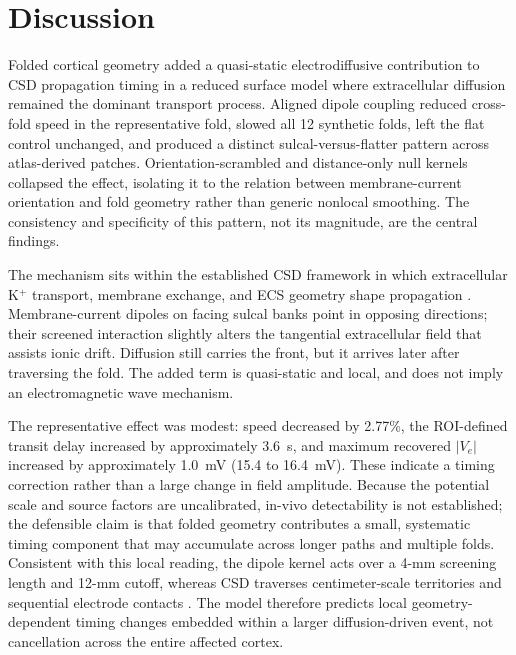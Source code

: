 \documentclass[12pt]{article}
\begin{document}
\section{Discussion}

Folded cortical geometry added a quasi-static electrodiffusive contribution to CSD propagation timing in a reduced surface model where extracellular diffusion remained the dominant transport process. Aligned dipole coupling reduced cross-fold speed in the representative fold, slowed all 12 synthetic folds, left the flat control unchanged, and produced a distinct sulcal-versus-flatter pattern across atlas-derived patches. Orientation-scrambled and distance-only null kernels collapsed the effect, isolating it to the relation between membrane-current orientation and fold geometry rather than generic nonlocal smoothing. The consistency and specificity of this pattern, not its magnitude, are the central findings.

The mechanism sits within the established CSD framework in which extracellular K$^+$ transport, membrane exchange, and ECS geometry shape propagation \citep{Tuckwell1978,Wei2014,Zandt2015,Kelley2022,Saetra2024,Sykova2008,Tonnesen2022}. Membrane-current dipoles on facing sulcal banks point in opposing directions; their screened interaction slightly alters the tangential extracellular field that assists ionic drift. Diffusion still carries the front, but it arrives later after traversing the fold. The added term is quasi-static and local, and does not imply an electromagnetic wave mechanism.

The representative effect was modest: speed decreased by 2.77\%, the ROI-defined transit delay increased by approximately 3.6~s, and maximum recovered $|V_e|$ increased by approximately 1.0~mV (15.4 to 16.4~mV). These indicate a timing correction rather than a large change in field amplitude. Because the potential scale and source factors are uncalibrated, in-vivo detectability is not established; the defensible claim is that folded geometry contributes a small, systematic timing component that may accumulate across longer paths and multiple folds. Consistent with this local reading, the dipole kernel acts over a 4-mm screening length and 12-mm cutoff, whereas CSD traverses centimeter-scale territories and sequential electrode contacts \citep{Dreier2017,Andrew2022}. The model therefore predicts local geometry-dependent timing changes embedded within a larger diffusion-driven event, not cancellation across the entire affected cortex.
\end{document}
